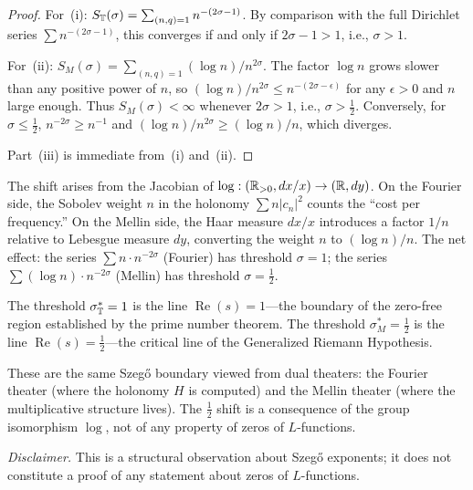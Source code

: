 \begin{proof}
For~(i): $S_{\mathbb{T}}(\sigma) = \sum_{(n,q)=1} n^{-(2\sigma-1)}$. By comparison with the full Dirichlet series $\sum n^{-(2\sigma-1)}$, this converges if and only if $2\sigma - 1 > 1$, i.e., $\sigma > 1$.

For~(ii): $S_M(\sigma) = \sum_{(n,q)=1} (\log n)/n^{2\sigma}$. The factor $\log n$ grows slower than any positive power of $n$, so $(\log n)/n^{2\sigma} \leq n^{-(2\sigma - \epsilon)}$ for any $\epsilon > 0$ and $n$ large enough. Thus $S_M(\sigma) < \infty$ whenever $2\sigma > 1$, i.e., $\sigma > \tfrac{1}{2}$. Conversely, for $\sigma \leq \tfrac{1}{2}$, $n^{-2\sigma} \geq n^{-1}$ and $(\log n)/n^{2\sigma} \geq (\log n)/n$, which diverges.

Part~(iii) is immediate from~(i) and~(ii).
\end{proof}

\begin{remark}
The shift arises from the Jacobian of $\log : (\mathbb{R}_{>0}, dx/x) \to (\mathbb{R}, dy)$. On the Fourier side, the Sobolev weight $n$ in the holonomy $\sum n|c_n|^2$ counts the ``cost per frequency.'' On the Mellin side, the Haar measure $dx/x$ introduces a factor $1/n$ relative to Lebesgue measure $dy$, converting the weight $n$ to $(\log n)/n$. The net effect: the series $\sum n \cdot n^{-2\sigma}$ (Fourier) has threshold $\sigma = 1$; the series $\sum (\log n) \cdot n^{-2\sigma}$ (Mellin) has threshold $\sigma = \tfrac{1}{2}$.
\end{remark}

\begin{remark}
The threshold $\sigma_{\mathbb{T}}^* = 1$ is the line $\operatorname{Re}(s) = 1$---the boundary of the zero-free region established by the prime number theorem. The threshold $\sigma_M^* = \tfrac{1}{2}$ is the line $\operatorname{Re}(s) = \tfrac{1}{2}$---the critical line of the Generalized Riemann Hypothesis.

These are the same Szeg\H{o} boundary viewed from dual theaters: the Fourier theater (where the holonomy $H$ is computed) and the Mellin theater (where the multiplicative structure lives). The $\tfrac{1}{2}$ shift is a consequence of the group isomorphism $\log$, not of any property of zeros of $L$-functions.

\emph{Disclaimer.} This is a structural observation about Szeg\H{o} exponents; it does not constitute a proof of any statement about zeros of $L$-functions.
\end{remark}


